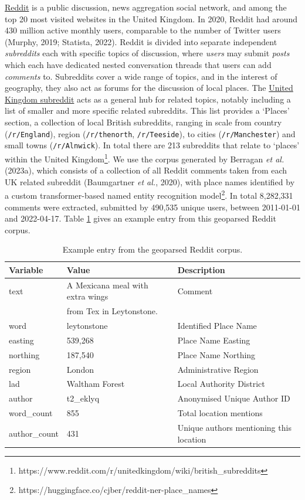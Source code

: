 \documentclass[
  letterpaper,
  11pt,
  english,
  onehalfspacing,
  headsepline]{MastersDoctoralThesis}
\begin{document}
\href{https://reddit.com}{Reddit} is a public discussion, news
aggregation social network, and among the top 20 most visited websites
in the United Kingdom. In 2020, Reddit had around 430 million active
monthly users, comparable to the number of Twitter users (Murphy, 2019;
Statista, 2022). Reddit is divided into separate independent
\emph{subreddits} each with specific topics of discussion, where
\emph{users} may submit \emph{posts} which each have dedicated nested
conversation threads that users can add \emph{comments} to. Subreddits
cover a wide range of topics, and in the interest of geography, they
also act as forums for the discussion of local places. The
\href{https://reddit.com/r/unitedkingdom}{United Kingdom subreddit} acts
as a general hub for related topics, notably including a list of smaller
and more specific related subreddits. This list provides a `Places'
section, a collection of local British subreddits, ranging in scale from
country (\texttt{/r/England}), region (\texttt{/r/thenorth},
\texttt{/r/Teeside}), to cities (\texttt{/r/Manchester}) and small towns
(\texttt{/r/Alnwick}). In total there are 213 subreddits that relate to
`places' within the United Kingdom\footnote{https://www.reddit.com/r/unitedkingdom/wiki/british\_subreddits}.
We use the corpus generated by Berragan \emph{et al.} (2023a), which
consists of a collection of all Reddit comments taken from each UK
related subreddit (Baumgartner \emph{et al.}, 2020), with place names
identified by a custom transformer-based named entity recognition
model\footnote{https://huggingface.co/cjber/reddit-ner-place\_names}. In
total 8,282,331 comments were extracted, submitted by 490,535 unique
users, between 2011-01-01 and 2022-04-17. Table \ref{tbl-example} gives
an example entry from this geoparsed Reddit corpus.

\begin{table}
\centering
\caption{Example entry from the geoparsed Reddit corpus.}
\label{tbl-example}
\fontsize{9}{11}\selectfont
\begin{tabular}{lll}
\toprule
\bfseries Variable & \bfseries Value & \bfseries Description \\
\midrule
text & A Mexicana meal with extra wings  & Comment \\
 & from Tex in Leytonstone. &  \\
word & leytonstone & Identified Place Name \\
easting & 539,268 & Place Name Easting \\
northing & 187,540 & Place Name Northing \\
region & London & Administrative Region \\
lad & Waltham Forest & Local Authority District \\
author & t2\_eklyq & Anonymised Unique Author ID \\
word\_count & 855 & Total location mentions \\
author\_count & 431 & Unique authors mentioning this location \\
\bottomrule
\end{tabular}
\end{table}
\end{document}
